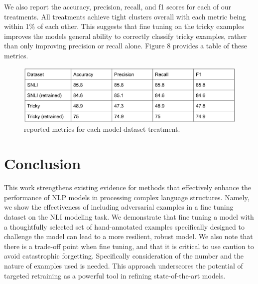 \documentclass{article}
\begin{document}
\newpage
We also report the accuracy, precision, recall, and f1 scores for each of our treatments. All treatments achieve tight
clusters overall with each metric being within 1\% of each other. This suggests that fine tuning on the tricky examples
improves the models general ability to correctly classify tricky examples, rather than only improving precision or recall
alone. Figure 8 provides a table of these metrics.

\begin{figure}[!h]
	\centering
	\includegraphics[width=\linewidth]{images/metrics_nlp_final_project.png}
	\caption{reported metrics for each model-dataset treatment.}
\end{figure}

\section{Conclusion}

This work strengthens existing evidence for methods that effectively enhance the performance of NLP models in processing
complex language structures. Namely, we show the effectiveness of including adversarial examples in a fine tuning dataset
on the NLI modeling task. We demonstrate that fine tuning a model with a thoughtfully selected set of hand-annotated examples
specifically designed to challenge the model can lead to a more resilient, robust model. We also note that there is
a trade-off point when fine tuning, and that it is critical to use caution to avoid catastrophic forgetting. Specifically
consideration of the number and the nature of examples used is needed. This approach underscores the potential of targeted
retraining as a powerful tool in refining state-of-the-art models.
\end{document}
